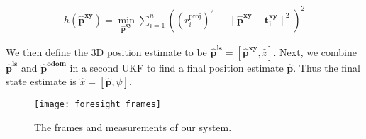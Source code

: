 \begin{align*} 
    h(\bm{\hat{p}^{xy}}) = \min_{{\bm{\hat{p}^{xy}}}} \sum_{i=1}^{n} ((r_{i}^{\text{proj}})^2 - \lVert \bm{\hat{p}^{xy}} - \bm{t_i^{xy}}\rVert^2)^2
\end{align*}

%

We then define the 3D position estimate to be $\bm{\hat{p}^{ls}} = [\bm{\hat{p}^{xy}}, \hat{z}]$. Next, we combine $\bm{\hat{p}^{ls}}$ and $\bm{\hat{p}^{\text{odom}}}$ in a second UKF to find a final position estimate $\bm{\hat{p}}$. Thus the final state estimate is $\hat{x} = [\bm{\hat{p}}, \psi]$.


\begin{figure}[tb!]
  \centering
    \texttt{[image: foresight\_frames]}
  \caption{The frames and measurements of our system.}
  \label{fig:frames}
\end{figure}







